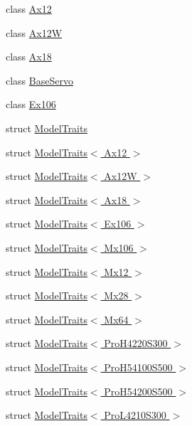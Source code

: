 \begin{DoxyCompactItemize}
\item 
class \hyperlink{classdynamixel_1_1servos_1_1_ax12}{Ax12}
\item 
class \hyperlink{classdynamixel_1_1servos_1_1_ax12_w}{Ax12\+W}
\item 
class \hyperlink{classdynamixel_1_1servos_1_1_ax18}{Ax18}
\item 
class \hyperlink{classdynamixel_1_1servos_1_1_base_servo}{Base\+Servo}
\item 
class \hyperlink{classdynamixel_1_1servos_1_1_ex106}{Ex106}
\item 
struct \hyperlink{structdynamixel_1_1servos_1_1_model_traits}{Model\+Traits}
\item 
struct \hyperlink{structdynamixel_1_1servos_1_1_model_traits_3_01_ax12_01_4}{Model\+Traits$<$ Ax12 $>$}
\item 
struct \hyperlink{structdynamixel_1_1servos_1_1_model_traits_3_01_ax12_w_01_4}{Model\+Traits$<$ Ax12\+W $>$}
\item 
struct \hyperlink{structdynamixel_1_1servos_1_1_model_traits_3_01_ax18_01_4}{Model\+Traits$<$ Ax18 $>$}
\item 
struct \hyperlink{structdynamixel_1_1servos_1_1_model_traits_3_01_ex106_01_4}{Model\+Traits$<$ Ex106 $>$}
\item 
struct \hyperlink{structdynamixel_1_1servos_1_1_model_traits_3_01_mx106_01_4}{Model\+Traits$<$ Mx106 $>$}
\item 
struct \hyperlink{structdynamixel_1_1servos_1_1_model_traits_3_01_mx12_01_4}{Model\+Traits$<$ Mx12 $>$}
\item 
struct \hyperlink{structdynamixel_1_1servos_1_1_model_traits_3_01_mx28_01_4}{Model\+Traits$<$ Mx28 $>$}
\item 
struct \hyperlink{structdynamixel_1_1servos_1_1_model_traits_3_01_mx64_01_4}{Model\+Traits$<$ Mx64 $>$}
\item 
struct \hyperlink{structdynamixel_1_1servos_1_1_model_traits_3_01_pro_h4220_s300_01_4}{Model\+Traits$<$ Pro\+H4220\+S300 $>$}
\item 
struct \hyperlink{structdynamixel_1_1servos_1_1_model_traits_3_01_pro_h54100_s500_01_4}{Model\+Traits$<$ Pro\+H54100\+S500 $>$}
\item 
struct \hyperlink{structdynamixel_1_1servos_1_1_model_traits_3_01_pro_h54200_s500_01_4}{Model\+Traits$<$ Pro\+H54200\+S500 $>$}
\item 
struct \hyperlink{structdynamixel_1_1servos_1_1_model_traits_3_01_pro_l4210_s300_01_4}{Model\+Traits$<$ Pro\+L4210\+S300 $>$}

\end{DoxyCompactItemize}
